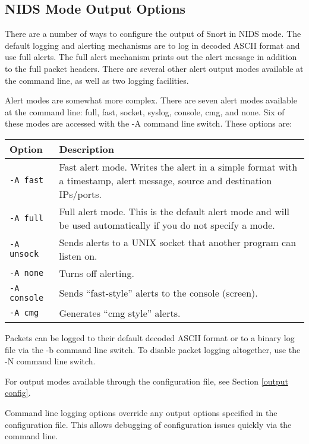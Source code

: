 \documentclass[english]{report}
\newenvironment{note}{
\samepage
    \vspace{10pt}{\textsf{
        {\hspace{7pt}\Huge{$\triangle$\hspace{-12.5pt}{\Large{$^!$}}}}\hspace{5pt}
        {\Large{NOTE}}
    }
    }
   \begin{center}
    \par\vspace{-17pt}

    \begin{lrbox}{\savepar}
    \begin{minipage}[r]{6in}
}
{
    \end{minipage}
    \end{lrbox}
    \fbox{
        \usebox{
            \savepar
	}
    }
    \par\vskip10pt
    \end{center}
}
\begin{document}
\subsection{NIDS Mode Output Options}

There are a number of ways to configure the output of Snort in NIDS
mode. The default logging and alerting mechanisms are to log in decoded
ASCII format and use full alerts. The full alert
mechanism prints out the alert message in addition to the full packet
headers. There are several other alert output modes available at the
command line, as well as two logging facilities.

Alert modes are somewhat more complex. There are seven alert modes available
at the command line: full, fast, socket, syslog, console, cmg, and
none. Six of these modes are accessed with the -A command line switch.
These options are:

\begin{tabular}{| l | p{5.4in} |}
\hline
{\bf Option} & {\bf Description}\\
\hline
\hline
{\tt -A fast} & Fast alert mode. Writes the alert in a simple format with a timestamp, alert message, source
and destination IPs/ports.\\
\hline
{\tt -A full} & Full alert mode. This is the default alert mode and will be used automatically if you do not specify a mode.\\
\hline
{\tt -A unsock} & Sends alerts to a UNIX socket that another program can listen on.\\
\hline
{\tt -A none} & Turns off alerting.\\
\hline
{\tt -A console} & Sends ``fast-style'' alerts to the console (screen).\\
\hline
{\tt -A cmg} & Generates ``cmg style'' alerts.\\
\hline
\end{tabular}

Packets can be logged to their default decoded ASCII format or to
a binary log file via the -b command line switch. To disable
packet logging altogether, use the -N command line switch.

For output modes available through the configuration file, see Section
\ref{output config}.

\begin{note}
Command line logging options override any output options specified 
in the configuration file. This allows debugging of configuration 
issues quickly via the command line.
\end{note}
\end{document}
